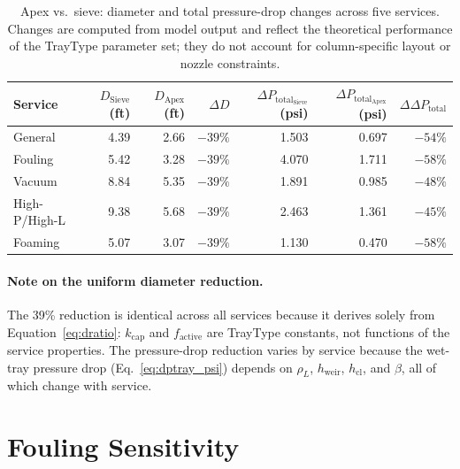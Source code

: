 \documentclass[11pt,letterpaper]{article}
\newcommand{\dptot}{\Delta P_{\mathrm{total}}}
\newcommand{\hcl}{h_{\mathrm{cl}}}
\begin{document}
\begin{table}[H]
\centering
\caption{Apex vs.\ sieve: diameter and total pressure-drop changes across
  five services.  Changes are computed from model output and reflect the
  theoretical performance of the TrayType parameter set; they do not
  account for column-specific layout or nozzle constraints.}
\label{tab:apex_sieve}
\small
\begin{tabular}{lrrrrrr}
\toprule
Service & $D_{\mathrm{Sieve}}$ (ft) & $D_{\mathrm{Apex}}$ (ft) & $\Delta D$
  & $\dptot_{\mathrm{Sieve}}$ (psi) & $\dptot_{\mathrm{Apex}}$ (psi) & $\Delta\dptot$\\
\midrule
General      & 4.39 & 2.66 & $-39\%$ & 1.503 & 0.697 & $-54\%$\\
Fouling      & 5.42 & 3.28 & $-39\%$ & 4.070 & 1.711 & $-58\%$\\
Vacuum       & 8.84 & 5.35 & $-39\%$ & 1.891 & 0.985 & $-48\%$\\
High-P/High-L& 9.38 & 5.68 & $-39\%$ & 2.463 & 1.361 & $-45\%$\\
Foaming      & 5.07 & 3.07 & $-39\%$ & 1.130 & 0.470 & $-58\%$\\
\bottomrule
\end{tabular}
\end{table}

\paragraph{Note on the uniform diameter reduction.}
The 39\% reduction is identical across all services because it derives solely
from Equation~\eqref{eq:dratio}: $k_{\mathrm{cap}}$ and $f_{\mathrm{active}}$
are TrayType constants, not functions of the service properties.  The
pressure-drop reduction varies by service because the wet-tray pressure drop
(Eq.~\eqref{eq:dptray_psi}) depends on $\rho_L$, $h_{\mathrm{weir}}$,
$\hcl$, and $\beta$, all of which change with service.

\section{Fouling Sensitivity}
\label{sec:fouling}
\end{document}
